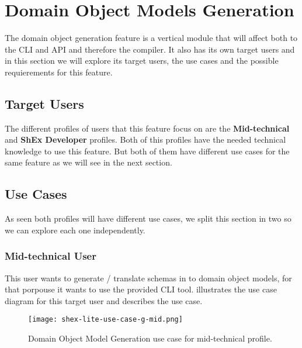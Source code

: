 \section{Domain Object Models Generation}

The domain object generation feature is a vertical module that will affect both to
the CLI and API and therefore the compiler. It also has its own target users and in this
section we will explore its target users, the use cases and the possible requierements
for this feature.

\subsection{Target Users}
The different profiles of users that this feature focus on are the \textbf{Mid-technical} and \textbf{ShEx Developer}
profiles. Both of this profiles have the needed technical knowledge to use this feature. But both of them have
different use cases for the same feature as we will see in the next section.

\subsection{Use Cases}
As seen both profiles will have different use cases, we split this section in two so we can explore each one independently.

\subsubsection{Mid-technical User}
This user wants to generate / translate schemas in to domain object models, for that porpouse it wants to use the
provided CLI tool.  illustrates the use case diagram for this target user and 
 describes the use case.

\begin{figure}[h]
    \texttt{[image: shex-lite-use-case-g-mid.png]}
    \caption[Domain Object Model Generation use case for mid-technical profile]{Domain Object Model Generation use case for mid-technical profile.}
\end{figure}

